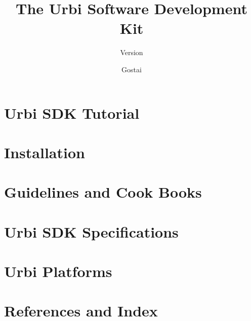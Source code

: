 \documentclass{gostai-report}
\title{The Urbi Software Development Kit}
\subtitle{Version \VcsDescription}
\author{Gostai}
\begin{document}
\maketitle



\tableofcontents

\part{Urbi SDK Tutorial}
\label{part:tut}





\part{Installation}
\label{part:install}


\part{Guidelines and Cook Books}
\label{part:guide}



\part{Urbi SDK Specifications}
\label{part:specs}


\part{Urbi Platforms}
\label{part:platforms}


\part{References and Index}
\label{part:ref}
\chapterIndex
\end{document}

